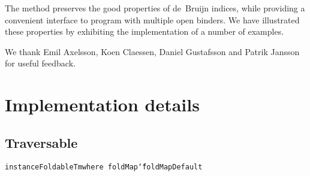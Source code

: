 \documentclass[9pt,preprint,authoryear]{sigplanconf}
\begin{document}
%
  The method preserves the good properties of de{~}Bruijn indices, while providing
  a convenient interface to program with multiple open binders. We have illustrated 
  these properties by exhibiting the implementation of a number of examples.


\acks{}We thank Emil Axelsson, Koen Claessen, Daniel Gustafsson and Patrik Jansson for
    useful feedback.





\newpage

\appendix

\section{Implementation details\label{implementationExtras}}

\subsection{Traversable}

%
{\noindent}%
%
\vphantom{$\{$}\textcolor[cmyk]{0,0.65,0.99,0}{\texttt{instance}}\textcolor[rgb]{0,0,0.80}{\texttt{\mbox{\hspace{0.50em}}}}\textcolor[rgb]{0,0,0.80}{\texttt{Foldable}}\textcolor[rgb]{0,0,0.80}{\texttt{\mbox{\hspace{0.50em}}}}\textcolor[rgb]{0,0,0.80}{\texttt{Tm}}\textcolor[rgb]{0,0,0.80}{\texttt{\mbox{\hspace{0.50em}}}}\textcolor[cmyk]{0,0.65,0.99,0}{\texttt{where}}\textcolor[rgb]{0,0,0.80}{\texttt{{\nopagebreak \newline%
}\vphantom{$\{$}}}\textcolor[rgb]{0,0,0.80}{\texttt{\mbox{\hspace{0.50em}}}}\textcolor[rgb]{0,0,0.80}{\texttt{\mbox{\hspace{0.50em}}}}\textcolor[rgb]{0,0,0.80}{\texttt{foldMap}}\textcolor[rgb]{0,0,0.80}{\texttt{\mbox{\hspace{0.50em}}}}\textcolor[cmyk]{0,0.65,0.99,0}{\texttt{{\char `\=}}}\textcolor[rgb]{0,0,0.80}{\texttt{\mbox{\hspace{0.50em}}}}\textcolor[rgb]{0,0,0.80}{\texttt{foldMapDefault}}\textcolor[rgb]{0,0,0.80}{\texttt{{\nopagebreak \newline%
}\vphantom{$\{$}}}%
\end{document}
